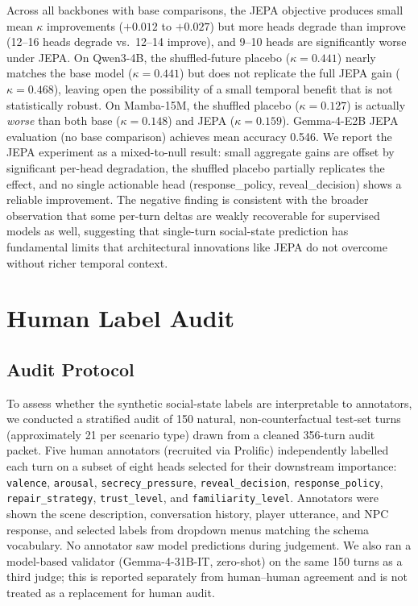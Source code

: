 \documentclass[11pt]{article}
\begin{document}
Across all backbones with base comparisons, the JEPA objective produces small mean $\kappa$ improvements ($+0.012$ to $+0.027$) but more heads degrade than improve (12--16 heads degrade vs.\ 12--14 improve), and 9--10 heads are significantly worse under JEPA.
On Qwen3-4B, the shuffled-future placebo ($\kappa{=}0.441$) nearly matches the base model ($\kappa{=}0.441$) but does not replicate the full JEPA gain ($\kappa{=}0.468$), leaving open the possibility of a small temporal benefit that is not statistically robust.
On Mamba-15M, the shuffled placebo ($\kappa{=}0.127$) is actually \textit{worse} than both base ($\kappa{=}0.148$) and JEPA ($\kappa{=}0.159$).
Gemma-4-E2B JEPA evaluation (no base comparison) achieves mean accuracy 0.546.
We report the JEPA experiment as a mixed-to-null result: small aggregate gains are offset by significant per-head degradation, the shuffled placebo partially replicates the effect, and no single actionable head (response\_policy, reveal\_decision) shows a reliable improvement.
The negative finding is consistent with the broader observation that some per-turn deltas are weakly recoverable for supervised models as well, suggesting that single-turn social-state prediction has fundamental limits that architectural innovations like JEPA do not overcome without richer temporal context.

\section{Human Label Audit}
\label{app:human_audit}

\subsection{Audit Protocol}

To assess whether the synthetic social-state labels are interpretable to annotators, we conducted a stratified audit of 150 natural, non-counterfactual test-set turns (approximately 21 per scenario type) drawn from a cleaned 356-turn audit packet.
Five human annotators (recruited via Prolific) independently labelled each turn on a subset of eight heads selected for their downstream importance:
\texttt{valence}, \texttt{arousal}, \texttt{secrecy\_pressure}, \texttt{reveal\_decision}, \texttt{response\_policy}, \texttt{repair\_strategy}, \texttt{trust\_level}, and \texttt{familiarity\_level}.
Annotators were shown the scene description, conversation history, player utterance, and NPC response, and selected labels from dropdown menus matching the schema vocabulary.
No annotator saw model predictions during judgement.
We also ran a model-based validator (Gemma-4-31B-IT, zero-shot) on the same 150 turns as a third judge; this is reported separately from human--human agreement and is not treated as a replacement for human audit.
\end{document}
